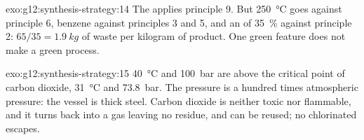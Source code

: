 \begin{solution}{exo:g12:synthesis-strategy:14}
The  applies principle 9. But \qty{250}{\celsius} goes against
principle 6, benzene against principles 3 and 5, and an  of
\qty{35}{\percent} against principle 2: $65/35 = \qty{1.9}{kg}$ of waste
per kilogram of product. One green feature does not make a green
process.
\end{solution}

\begin{solution}{exo:g12:synthesis-strategy:15}
\qty{40}{\celsius} and \qty{100}{bar} are above the critical point of
carbon dioxide, \qty{31}{\celsius} and \qty{73.8}{bar}. The pressure is a
hundred times atmospheric pressure: the vessel is thick steel. Carbon
dioxide is neither toxic nor flammable, and it turns back into a gas
leaving no residue, and can be reused; no chlorinated  escapes.
\end{solution}

